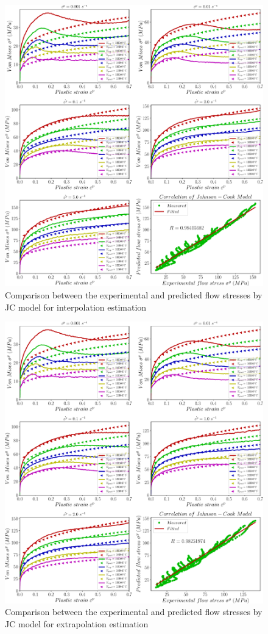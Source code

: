\documentclass[twoside,english,1p,final,sort&compress]{elsarticle}
\theoremstyle{plain}
\begin{document}
\begin{figure}[!ht]
\centering
\includegraphics[width=1.02\columnwidth]
{newFigures/iCorrelationJC}
\caption{Comparison between the experimental and predicted flow stresses by JC model for interpolation estimation}
\label{fig:iCorrelationJC}
\end{figure}
\begin{figure}[!ht]
\centering
\includegraphics[width=1.02\columnwidth]
{newFigures/eCorrelationJC}
\caption{Comparison between the experimental and predicted flow stresses by JC model for extrapolation estimation}
\label{fig:eCorrelationJC}
\end{figure}
\end{document}
